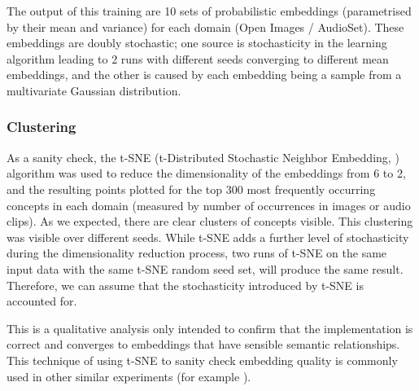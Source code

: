 The output of this training are 10 sets of probabilistic embeddings (parametrised by their mean and variance) for each domain (Open Images / AudioSet). These embeddings are doubly stochastic; one source is stochasticity in the learning algorithm leading to 2 runs with different seeds converging to different mean embeddings, and the other is caused by each embedding being a sample from a multivariate Gaussian distribution. 

\subsubsection{Clustering}
As a sanity check, the t-SNE (t-Distributed Stochastic Neighbor Embedding, \cite{tsne}) algorithm was  used to reduce the dimensionality of the embeddings from 6 to 2, and the resulting points plotted for the top 300 most frequently occurring concepts in each domain (measured by number of occurrences in images or audio clips). As we expected, there are clear clusters of concepts visible. This clustering was visible over different seeds. While t-SNE adds a further level of stochasticity during the dimensionality reduction process, two runs of t-SNE on the same input data with the same t-SNE random seed set, will produce the same result. Therefore, we can assume that the stochasticity introduced by t-SNE is accounted for. 

This is a qualitative analysis only intended to confirm that the implementation is correct and converges to embeddings that have sensible semantic relationships. This technique of using t-SNE to sanity check embedding quality is commonly used in other similar experiments (for example \cite{CoocurrenceVisionLanguage2021}). 

